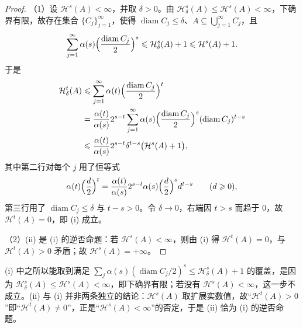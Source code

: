 \documentclass[../../main.tex]{subfiles}%
\begin{document}
\begin{proof}
（1）设 $\mathcal{H}^s(A)<\infty$，并取 $\delta>0$。由 $\mathcal{H}^s_\delta(A)\leqslant\mathcal{H}^s(A)<\infty$，下确界有限，故存在集合 $\{C_j\}_{j=1}^{\infty}$，使得 $\operatorname{diam}C_j\leqslant\delta$、$A\subseteq\bigcup_{j=1}^{\infty}C_j$，且
\begin{align*}
\sum_{j=1}^{\infty}\alpha(s)\Bigl(\frac{\operatorname{diam}C_j}{2}\Bigr)^s\leqslant\mathcal{H}^s_\delta(A)+1\leqslant\mathcal{H}^s(A)+1.
\end{align*}
于是
\begin{align*}
\mathcal{H}^t_\delta(A)&\leqslant\sum_{j=1}^{\infty}\alpha(t)\Bigl(\frac{\operatorname{diam}C_j}{2}\Bigr)^t\\
&=\frac{\alpha(t)}{\alpha(s)}2^{s-t}\sum_{j=1}^{\infty}\alpha(s)\Bigl(\frac{\operatorname{diam}C_j}{2}\Bigr)^s(\operatorname{diam}C_j)^{t-s}\\
&\leqslant\frac{\alpha(t)}{\alpha(s)}2^{s-t}\delta^{t-s}\bigl(\mathcal{H}^s(A)+1\bigr),
\end{align*}
其中第二行对每个 $j$ 用了恒等式
\begin{align*}
\alpha(t)\Bigl(\frac{d}{2}\Bigr)^t=\frac{\alpha(t)}{\alpha(s)}2^{s-t}\alpha(s)\Bigl(\frac{d}{2}\Bigr)^s d^{t-s}\qquad(d\geqslant0),
\end{align*}
第三行用了 $\operatorname{diam}C_j\leqslant\delta$ 与 $t-s>0$。令 $\delta\to0$，右端因 $t>s$ 而趋于 $0$，故 $\mathcal{H}^t(A)=0$，即 (i) 成立。

（2）(ii) 是 (i) 的逆否命题：若 $\mathcal{H}^s(A)<\infty$，则由 (i) 得 $\mathcal{H}^t(A)=0$，与 $\mathcal{H}^t(A)>0$ 矛盾；故 $\mathcal{H}^s(A)=+\infty$。
\end{proof}

\begin{remark}\label{remark:ch02-lem-2-2-补证说明}
(i) 中之所以能取到满足 $\sum_j\alpha(s)(\operatorname{diam}C_j/2)^s\leqslant\mathcal{H}^s_\delta(A)+1$ 的覆盖，是因为 $\mathcal{H}^s_\delta(A)\leqslant\mathcal{H}^s(A)<\infty$，即下确界有限；若没有 $\mathcal{H}^s(A)<\infty$，这一步不成立。(ii) 与 (i) 并非两条独立的结论：$\mathcal{H}^s(A)$ 取扩展实数值，故“$\mathcal{H}^t(A)>0$”即“$\mathcal{H}^t(A)\neq0$”，正是“$\mathcal{H}^s(A)<\infty$”的否定，于是 (ii) 恰为 (i) 的逆否命题。
\end{remark}
\end{document}

